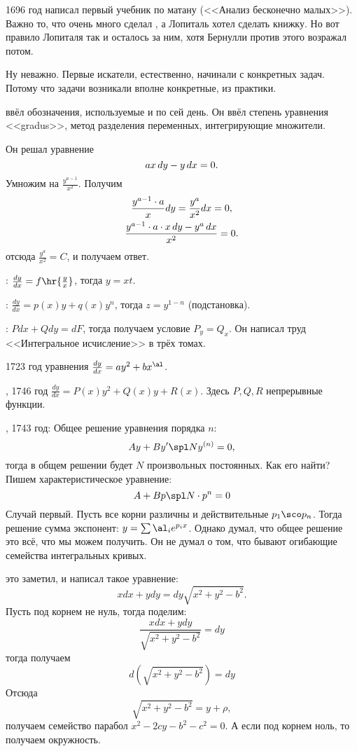\documentclass[a4paper,oneside,fleqn,10pt]{article}
\begin{document}
1696 год  написал первый учебник по матану (<<Анализ
бесконечно малых>>).  Важно то, что очень много сделал
, а Лопиталь хотел сделать книжку.  Но вот правило
Лопиталя так и осталось за ним, хотя Бернулли против этого возражал
потом.

Ну неважно. Первые искатели, естественно, начинали с конкретных задач.
Потому что задачи возникали вполне конкретные, из практики.

 ввёл обозначения, используемые и по сей день.  Он ввёл
степень уравнения <<gradus>>, метод разделения переменных,
интегрирующие множители.

Он решал уравнение
$$ax\,dy - y\,dx = 0.$$ Умножим на $\frac{y^{a-1}}{x^2}$. Получим
\begin{gather*}
\frac{y^{a-1}\cdot a}{x}dy = \frac{y^a}{x^2} dx =
0,\\ \frac{y^{a-1}\cdot a \cdot x\,dy - y^a\,dx}{x^2} = 0.
\end{gather*}
отсюда $\frac{y^a}{x^2} = C$, и получаем ответ.

: $\frac{dy}{dx} = f\hr{\frac yx}$, тогда $y = xt$.

: $\frac{dy}{dx} = p(x) y + q(x) y^n$, тогда $z =
y^{1-n}$ (подстановка).

: $Pdx + Qdy = dF$, тогда получаем условие $P_y = Q_x$. Он
написал труд <<Интегральное исчисление>> в трёх томах.

1723 год уравнения  $\frac{dy}{dx} = ay^2 + bx^\al$.

, 1746 год $\frac{dy}{dx} = P(x)y^2 + Q(x)y + R(x)$.
Здесь $P, Q, R$ непрерывные функции.

, 1743 год: Общее решение уравнения порядка $n$:
$$Ay + B y' \spl N y^{(n)} = 0,$$ тогда в общем решении будет $N$
произвольных постоянных.  Как его найти? Пишем характеристическое
уравнение:
$$A + Bp \spl N \cdot p^n =0$$ Случай первый. Пусть все корни различны
и действительные $p_1\sco p_n$.  Тогда решение сумма экспонент: $y =
\sum \al_i e^{p_i x}$.  Однако  думал, что общее решение
это всё, что мы можем получить.  Он не думал о том, что бывают
огибающие семейства интегральных кривых.

 это заметил, и написал такое уравнение:
$$x dx + y dy = dy \sqrt{x^2 + y^2 - b^2}.$$ Пусть под корнем не нуль,
тогда поделим:
$$\frac{x dx + y dy}{\sqrt{x^2 + y^2 - b^2}} = dy$$ тогда получаем
$$d(\sqrt{x^2 + y^2 - b^2}) = dy$$ Отсюда
$$\sqrt{x^2 + y^2 - b^2} = y + \rho,$$ получаем семейство парабол $x^2
- 2cy - b^2 -c^2 = 0$.  А если под корнем ноль, то получаем
окружность.
\end{document}
